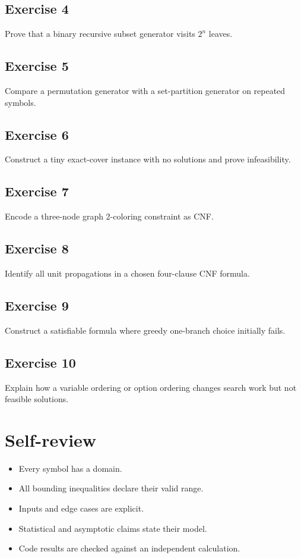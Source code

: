 \documentclass[11pt,letterpaper]{article}
\begin{document}
\subsection{Exercise 4}\noindent Prove that a binary recursive subset generator visits $2^n$ leaves.
\subsection{Exercise 5}\noindent Compare a permutation generator with a set-partition generator on repeated symbols.
\subsection{Exercise 6}\noindent Construct a tiny exact-cover instance with no solutions and prove infeasibility.
\subsection{Exercise 7}\noindent Encode a three-node graph 2-coloring constraint as CNF.
\subsection{Exercise 8}\noindent Identify all unit propagations in a chosen four-clause CNF formula.
\subsection{Exercise 9}\noindent Construct a satisfiable formula where greedy one-branch choice initially fails.
\subsection{Exercise 10}\noindent Explain how a variable ordering or option ordering changes search work but not feasible solutions.
\section{Self-review}
\begin{itemize}\item Every symbol has a domain.\item All bounding inequalities declare their valid range.\item Inputs and edge cases are explicit.\item Statistical and asymptotic claims state their model.\item Code results are checked against an independent calculation.\end{itemize}
\end{document}
